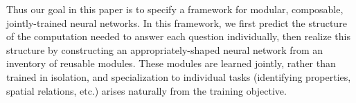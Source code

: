 Thus our goal in this paper is to specify a framework for modular, composable,
jointly-trained neural networks. In this framework, we first predict the
structure of the computation needed to answer each question individually, then
realize this structure by constructing an appropriately-shaped neural network
from an inventory of reusable modules. These modules are learned jointly, rather
than trained in isolation, and specialization to individual tasks (identifying
properties, spatial relations, etc.) arises naturally from the training
objective.

%





